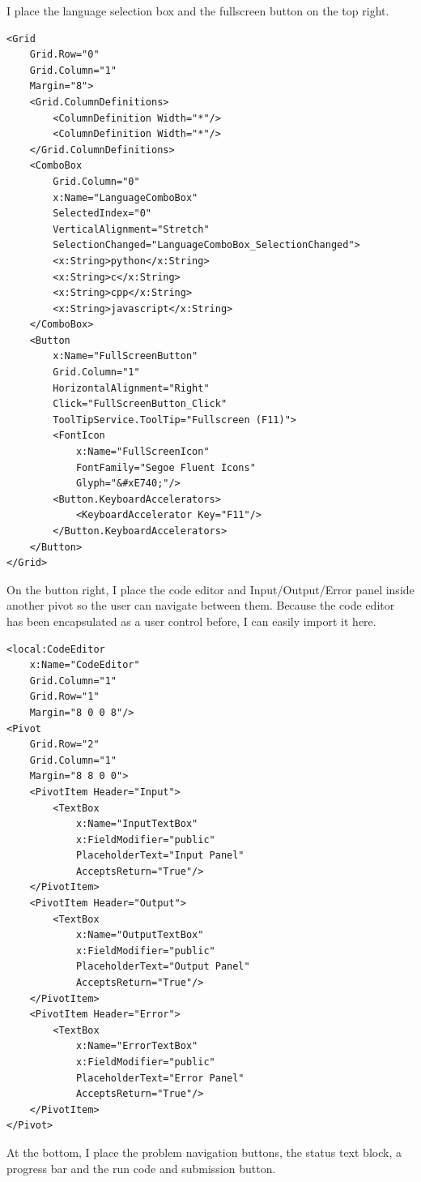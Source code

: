 \documentclass[a4paper]{report}
\begin{document}
I place the language selection box and the fullscreen button on the top right.

\begin{verbatim}
<Grid
    Grid.Row="0"
    Grid.Column="1"
    Margin="8">
    <Grid.ColumnDefinitions>
        <ColumnDefinition Width="*"/>
        <ColumnDefinition Width="*"/>
    </Grid.ColumnDefinitions>
    <ComboBox
        Grid.Column="0"
        x:Name="LanguageComboBox"
        SelectedIndex="0"
        VerticalAlignment="Stretch"
        SelectionChanged="LanguageComboBox_SelectionChanged">
        <x:String>python</x:String>
        <x:String>c</x:String>
        <x:String>cpp</x:String>
        <x:String>javascript</x:String>
    </ComboBox>
    <Button
        x:Name="FullScreenButton"
        Grid.Column="1"
        HorizontalAlignment="Right"
        Click="FullScreenButton_Click"
        ToolTipService.ToolTip="Fullscreen (F11)">
        <FontIcon
            x:Name="FullScreenIcon"
            FontFamily="Segoe Fluent Icons"
            Glyph="&#xE740;"/>
        <Button.KeyboardAccelerators>
            <KeyboardAccelerator Key="F11"/>
        </Button.KeyboardAccelerators>
    </Button>
</Grid>
\end{verbatim}

On the button right, I place the code editor and  Input/Output/Error panel inside another pivot so the user can navigate between them. Because the code editor has been encapsulated as a user control before, I can easily import it here.

\begin{verbatim}
<local:CodeEditor
    x:Name="CodeEditor"
    Grid.Column="1"
    Grid.Row="1"
    Margin="8 0 0 8"/>
<Pivot
    Grid.Row="2"
    Grid.Column="1"
    Margin="8 8 0 0">
    <PivotItem Header="Input">
        <TextBox
            x:Name="InputTextBox"
            x:FieldModifier="public"
            PlaceholderText="Input Panel"
            AcceptsReturn="True"/>
    </PivotItem>
    <PivotItem Header="Output">
        <TextBox
            x:Name="OutputTextBox"
            x:FieldModifier="public"
            PlaceholderText="Output Panel"
            AcceptsReturn="True"/>
    </PivotItem>
    <PivotItem Header="Error">
        <TextBox
            x:Name="ErrorTextBox"
            x:FieldModifier="public"
            PlaceholderText="Error Panel"
            AcceptsReturn="True"/>
    </PivotItem>
</Pivot>
\end{verbatim}

At the bottom, I place the problem navigation buttons, the status text block, a progress bar and the run code and submission button.
\end{document}
